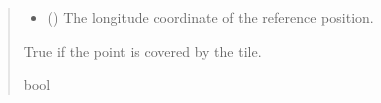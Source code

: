 \documentclass[letterpaper,10pt,english]{sphinxmanual}
\begin{document}
\begin{fulllineitems}
\begin{fulllineitems}
\begin{quote}
\begin{description}
\begin{itemize}
\item {} 
\sphinxAtStartPar
{} () \textendash{} The longitude coordinate of the reference position.

\end{itemize}

\sphinxAtStartPar
True if the point is covered by the tile.

\sphinxAtStartPar
bool

\end{description}\end{quote}

\end{fulllineitems}



\end{fulllineitems}
\end{document}
